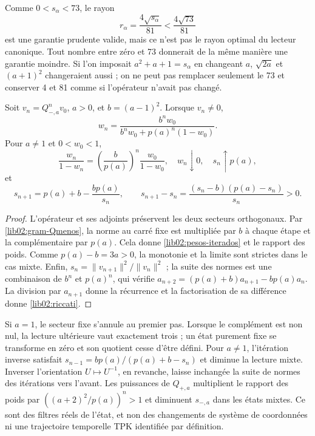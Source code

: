 Comme \(0<s_\alpha<73\), le rayon
\[
 r_\alpha=\frac{4\sqrt{s_\alpha}}{81}<\frac{4\sqrt{73}}{81}
\]
est une garantie prudente valide, mais ce n’est pas le rayon optimal du
lecteur canonique. Tout nombre entre zéro et 73 donnerait de la même manière
une garantie moindre. Si l’on imposait \(a^2+a+1=s_\alpha\) en changeant
\(a\), \(\sqrt{2a}\) et \((a+1)^2\) changeraient aussi ; on ne
peut pas remplacer seulement le 73 et conserver 4 et 81 comme si l’opérateur
n’avait pas changé.

\begin{theorem}
\label{lib02:iteraciones}
Soit \(v_n=Q_{-,a}^nv_0\), \(a>0\), et \(b=(a-1)^2\). Lorsque \(v_n\ne0\),
\begin{equation}
 w_n=\frac{b^nw_0}{b^nw_0+p(a)^n(1-w_0)}.
 \label{lib02:pesos-iterados}
\end{equation}
Pour \(a\ne1\) et \(0<w_0<1\),
\[
 \frac{w_n}{1-w_n}
 =\left(\frac b{p(a)}\right)^n\frac{w_0}{1-w_0},
 \quad w_n\downarrow0,\quad s_n\uparrow p(a),
\]
et
\begin{equation}
 s_{n+1}=p(a)+b-\frac{bp(a)}{s_n},\qquad
 s_{n+1}-s_n=\frac{(s_n-b)(p(a)-s_n)}{s_n}>0.
 \label{lib02:riccati}
\end{equation}
\end{theorem}
\begin{proof}
L’opérateur et ses adjoints préservent les deux secteurs orthogonaux. Par
\eqref{lib02:gram-Qmenos}, la norme au carré fixe est multipliée par
\(b\) à chaque étape et la complémentaire par \(p(a)\). Cela donne
\eqref{lib02:pesos-iterados} et le rapport des poids. Comme
\(p(a)-b=3a>0\), la monotonie et la limite sont strictes dans le cas
mixte. Enfin,
\(s_n=\|v_{n+1}\|^2/\|v_n\|^2\) ; la suite des normes est
une combinaison de \(b^n\) et \(p(a)^n\), qui vérifie
\(a_{n+2}=(p(a)+b)a_{n+1}-bp(a)a_n\). La division par
\(a_{n+1}\) donne la récurrence et la factorisation de sa différence donne
\eqref{lib02:riccati}.
\end{proof}

Si \(a=1\), le secteur fixe s’annule au premier pas. Lorsque le
complément est non nul, la lecture ultérieure vaut exactement trois ;
un état purement fixe se transforme en zéro et son quotient cesse
d’être défini. Pour \(a\ne1\), l’itération inverse satisfait
\(s_{n-1}=bp(a)/(p(a)+b-s_n)\) et diminue la lecture mixte.
Inverser l’orientation \(U\mapsto U^{-1}\), en revanche, laisse
inchangée la suite de normes des itérations vers l’avant.
Les puissances de \(Q_{+,a}\) multiplient le rapport des poids par
\(((a+2)^2/p(a))^n>1\) et diminuent \(s_{-,a}\) dans les états
mixtes. Ce sont des filtres réels de l’état, et non des changements de système de coordonnées ni une
trajectoire temporelle TPK identifiée par définition.

